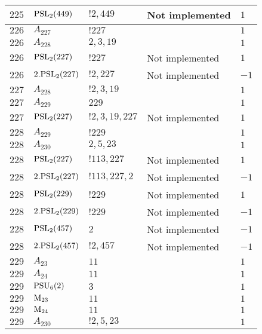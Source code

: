 \documentclass[a4paper, 11pt]{article}
\begin{document}
\begin{longtable}{lllll}
        $ 225 $ & $ {\rm PSL}_{2}(449) $ & $ !2, 449 $ &  Not implemented & $ 1$ \\ \hline
        $ 226 $ & $ A_{227} $ & $ !227 $ & $ ~ $ & $ 1$ \\ \hline
        $ 226 $ & $ A_{228} $ & $ 2, 3, 19 $ & $ ~ $ & $ 1$ \\ \hline
        $ 226 $ & $ {\rm PSL}_{2}(227) $ & $ !227 $ &  Not implemented & $ 1$ \\ \hline
        $ 226 $ & $ 2.{\rm PSL}_{2}(227) $ & $ !2, 227 $ &  Not implemented & $ -1$ \\ \hline
        $ 227 $ & $ A_{228} $ & $ !2, 3, 19 $ & $ ~ $ & $ 1$ \\ \hline
        $ 227 $ & $ A_{229} $ & $ 229 $ & $ ~ $ & $ 1$ \\ \hline
        $ 227 $ & $ {\rm PSL}_{2}(227) $ & $ !2, 3, 19, 227 $ &  Not implemented & $ 1$ \\ \hline
        $ 228 $ & $ A_{229} $ & $ !229 $ & $ ~ $ & $ 1$ \\ \hline
        $ 228 $ & $ A_{230} $ & $ 2, 5, 23 $ & $ ~ $ & $ 1$ \\ \hline
        $ 228 $ & $ {\rm PSL}_{2}(227) $ & $ !113, 227 $ &  Not implemented & $ 1$ \\ \hline
        $ 228 $ & $ 2.{\rm PSL}_{2}(227) $ & $ !113, 227, 2 $ &  Not implemented & $ -1$ \\ \hline
        $ 228 $ & $ {\rm PSL}_{2}(229) $ & $ !229 $ &  Not implemented & $ 1$ \\ \hline
        $ 228 $ & $ 2.{\rm PSL}_{2}(229) $ & $ !229 $ &  Not implemented & $ -1$ \\ \hline
        $ 228 $ & $ {\rm PSL}_{2}(457) $ & $ 2 $ &  Not implemented & $ -1$ \\ \hline
        $ 228 $ & $ 2.{\rm PSL}_{2}(457) $ & $ !2, 457 $ &  Not implemented & $ -1$ \\ \hline
        $ 229 $ & $ A_{23} $ & $ 11 $ & $ ~ $ & $ 1$ \\ \hline
        $ 229 $ & $ A_{24} $ & $ 11 $ & $ ~ $ & $ 1$ \\ \hline
        $ 229 $ & $ {\rm PSU}_{6}(2) $ & $ 3 $ & $ ~ $ & $ 1$ \\ \hline
        $ 229 $ & $ {\rm M}_{23} $ & $ 11 $ & $ ~ $ & $ 1$ \\ \hline
        $ 229 $ & $ {\rm M}_{24} $ & $ 11 $ & $ ~ $ & $ 1$ \\ \hline
        $ 229 $ & $ A_{230} $ & $ !2, 5, 23 $ & $ ~ $ & $ 1$ \\ \hline

\end{longtable}
\end{document}
